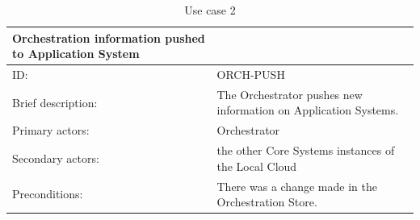 \documentclass[a4paper]{arrowhead}
\begin{document}
\begin{table}[h]
	\caption{Use case 2}
	\label{table:2}
	\centering
	\begin{adjustbox}{max width=\textwidth}
	\begin{tabular}{|l|l|}
		\hline
		Orchestration information pushed to Application System &                                                                                                                                                                                                                                                                                                                                              \\ \hline
		ID:                                                    & ORCH-PUSH                                                                                                                                                                                                                                                                                                                                    \\ \hline
		Brief description:                                     & The Orchestrator pushes new information on Application Systems.                                                                                                                                                                                                                                                                              \\ \hline
		Primary actors:                                        & Orchestrator                                                                                                                                                                                                                                                                                                                                 \\ \hline
		Secondary actors:                                      & the other Core Systems instances of the Local Cloud                                                                                                                                                                                                                                                                                          \\ \hline
		Preconditions:                                         & There was a change made in the Orchestration Store.                                                                                                                                                                                                                                                                                          \\ \hline

\end{tabular}
\end{adjustbox}
\end{table}
\end{document}
